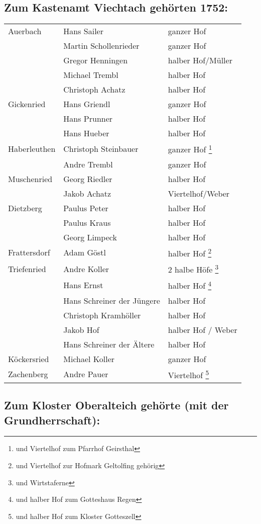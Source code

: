 \documentclass[12pt,a4pager]{book}
\begin{document}
\subsection{Zum Kastenamt Viechtach gehörten 1752:}

\begin{longtable}{l|l|l}
Auerbach & Hans Sailer & ganzer Hof\\
& Martin Schollenrieder & ganzer Hof\\
& Gregor Henningen & halber Hof/Müller\\
& Michael Trembl & halber Hof\\
& Christoph Achatz & halber Hof\\
Gickenried & Hans Griendl & ganzer Hof\\
& Hans Prunner & halber Hof\\
& Hans Hueber & halber Hof\\
Haberleuthen & Christoph Steinbauer & ganzer Hof \footnote{und Viertelhof zum Pfarrhof Geirsthal}\\
& Andre Trembl & ganzer Hof\\
Muschenried & Georg Riedler & halber Hof\\
& Jakob Achatz & Viertelhof/Weber\\
Dietzberg & Paulus Peter & halber Hof\\
& Paulus Kraus & halber Hof\\
& Georg Limpeck & halber Hof\\
Frattersdorf & Adam Göstl & halber Hof \footnote{und Viertelhof zur Hofmark Geltolfing gehörig}\\
Triefenried & Andre Koller & 2 halbe Höfe \footnote{und Wirtstaferne}\\
& Hans Ernst & halber Hof \footnote{und halber Hof zum Gotteshaus Regen}\\
& Hans Schreiner der Jüngere & halber Hof\\
& Christoph Kramhöller & halber Hof\\
& Jakob Hof & halber Hof / Weber\\
& Hans Schreiner der Ältere & halber Hof\\
Köckersried & Michael Koller & ganzer Hof\\
Zachenberg & Andre Pauer & Viertelhof \footnote{und halber Hof zum Kloster Gotteszell}\\
\end{longtable}

\subsection{Zum Kloster Oberalteich gehörte (mit der Grundherrschaft):}
\end{document}
